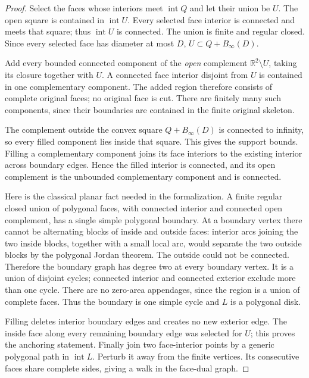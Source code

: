 \documentclass[11pt,a4paper]{article}
\theoremstyle{remark}
\begin{document}
\begin{proof}
Select the faces whose interiors meet $\operatorname{int}Q$ and let their
union be $U$.  The open square is contained in $\operatorname{int}U$.
Every selected face interior is connected and meets that square; thus
$\operatorname{int}U$ is connected.  The union is finite and regular closed.
Since every selected face has diameter at most $D$,
$U\subset Q+B_\infty(D)$.

Add every bounded connected component of the \emph{open} complement
$\mathbb R^2\setminus U$, taking its closure together with $U$.  A connected
face interior disjoint from $U$ is contained in one complementary component.
The added region therefore consists of complete original faces; no original
face is cut.  There are finitely many such components, since their boundaries
are contained in the finite original skeleton.

The complement outside the convex square $Q+B_\infty(D)$ is connected to
infinity, so every filled component lies inside that square.  This gives the
support bounds.  Filling a complementary component joins its face interiors
to the existing interior across boundary edges.  Hence the filled interior
is connected, and its open complement is the unbounded complementary
component and is connected.

Here is the classical planar fact needed in the formalization.  A finite
regular closed union of polygonal faces, with connected interior and
connected open complement, has a single simple polygonal boundary.  At a
boundary vertex there cannot be alternating blocks of inside and outside
faces: interior arcs joining the two inside blocks, together with a small
local arc, would separate the two outside blocks by the polygonal Jordan
theorem.  The outside could not be connected.  Therefore the boundary graph
has degree two at every boundary vertex.  It is a union of disjoint cycles;
connected interior and connected exterior exclude more than one cycle.
There are no zero-area appendages, since the region is a union of complete
faces.  Thus the boundary is one simple cycle and $L$ is a polygonal disk.

Filling deletes interior boundary edges and creates no new exterior edge.
The inside face along every remaining boundary edge was selected for $U$;
this proves the anchoring statement.  Finally join two face-interior points
by a generic polygonal path in $\operatorname{int}L$.  Perturb it away from
the finite vertices.  Its consecutive faces share complete sides, giving
a walk in the face-dual graph.
\end{proof}
\end{document}
